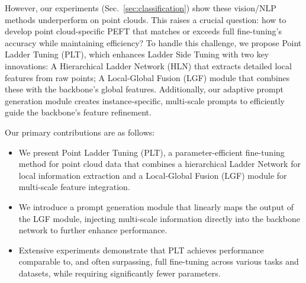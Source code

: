 However, our experiments (Sec.~\ref{sec:classification}) show these vision/NLP methods underperform on point clouds. This raises a crucial question: how to develop point cloud-specific PEFT that matches or exceeds full fine-tuning's accuracy while maintaining efficiency? To handle this challenge, we propose Point Ladder Tuning (PLT), which enhances Ladder Side Tuning with two key innovations: A Hierarchical Ladder Network (HLN) that extracts detailed local features from raw points; A Local-Global Fusion (LGF) module that combines these with the backbone's global features. Additionally, our adaptive prompt generation module creates instance-specific, multi-scale prompts to efficiently guide the backbone's feature refinement.

Our primary contributions are as follows:

\begin{itemize} 
	\item We present Point Ladder Tuning (PLT), a parameter-efficient fine-tuning method for point cloud data that combines a hierarchical Ladder Network for local information extraction and a Local-Global Fusion (LGF) module for multi-scale feature integration. 
	\item We introduce a prompt generation module that linearly maps the output of the LGF module, injecting multi-scale information directly into the backbone network to further enhance performance. 
	\item {}Extensive experiments demonstrate that PLT achieves performance comparable to, and often surpassing, full fine-tuning across various tasks and datasets, while requiring significantly fewer parameters. 
\end{itemize}


